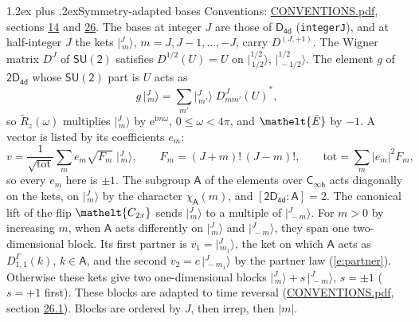 \documentclass[10pt,a4paper]{article}
\makeatletter
\renewcommand\section{\@startsection{section}{1}{\z@}{-3ex plus -1ex minus -.2ex}%
  {1.2ex plus .2ex}{\normalfont\large\sffamily\bfseries\color{parttitle}}}
\numberwithin{equation}{section}
\newcommand{\eltfont}[1]{{\let\sigma\eltsigma\mathelt{#1}}}
\newcommand{\grp}[1]{\mathsf{#1}}
\newcommand{\elt}[1]{\eltfont{#1}}
\newcommand{\grpindex}[2]{[#1 : #2]}
\newcommand{\iunit}{\mathrm{i}}
\newcommand{\expe}{\mathrm{e}}
\newcommand{\irrJp}[2]{D^{(#1,#2)}}
\newcommand{\repD}[1]{D^{#1}}
\newcommand{\wignerD}[1]{D^{#1}}
\newcommand{\chiA}{\chi_{\grp{A}}}
\newcommand{\conj}[1]{{#1}^{*}}
\newcommand{\jm}[2]{\bigl\lvert{}^{#1}_{\,#2}\bigr\rangle}
\newcommand{\barred}[1]{\bar{#1}}
\newcommand{\lift}[1]{\tilde{#1}}
\makeatother
\begin{document}
\section{Symmetry-adapted bases}\label{s:bases}
Conventions: \href{../../CONVENTIONS.pdf}{CONVENTIONS.pdf}, sections \href{../../../rotation/CONVENTIONS.pdf\#conv.14}{14} and \href{../../CONVENTIONS.pdf\#conv.26}{26}.
\leavevmode\label{n:index.m}\label{n:vector.ket}The bases at integer $J$ are those of \href{../../../rotation/data/pdf/D4d.pdf}{$\grp{D_{4d}}$} (\texttt{integerJ}), and at half-integer $J$ the kets $\jm{J}{m}$, $m = J, J-1, \dots, -J$, carry $\irrJp{J}{+1}$. \label{n:matrix.wigner}The Wigner matrix $\wignerD{J}$ of $\grp{SU(2)}$ satisfies $\wignerD{1/2}(U) = U$ on $\jm{1/2}{1/2}$, $\jm{1/2}{-1/2}$. The element $g$ of $\grp{2D_{4d}}$ whose $\grp{SU(2)}$ part is $U$ acts as
\begin{equation}\label{e:action}g\,\jm{J}{m} = \sum_{m'} \jm{J}{m'}\; \conj{\wignerD{J}_{m m'}(U)},\end{equation}
so $\lift{R}_{z}(\omega)$ multiplies $\jm{J}{m}$ by $\expe^{\iunit m\omega}$, $0 \le \omega < 4\pi$, and $\elt{\barred{E}}$ by $-1$. \label{n:index.ketcoefficient}\label{n:vector.basis.symmetry}\label{n:index.ketweight}\label{n:index.total}A vector is listed by its coefficients $e_m$:
\begin{equation}\label{e:ket}v = \frac{1}{\sqrt{\mathrm{tot}}}\sum_m e_m\sqrt{F_m}\;\jm{J}{m},\qquad F_m = (J+m)!\,(J-m)!,\qquad \mathrm{tot} = \sum_m |e_m|^2F_m,\end{equation}
so every $e_m$ here is $\pm 1$.
\leavevmode\label{n:group.A}\label{n:function.character.abelian}The subgroup $\grp{A}$ of the elements over $\grp{C_{\infty h}}$ acts diagonally on the kets, on $\jm{J}{m}$ by the character $\chiA(m)$, and $\grpindex{\grp{2D_{4d}}}{\grp{A}} = 2$. The canonical lift of the flip $\elt{C_{2x}}$ sends $\jm{J}{m}$ to a multiple of $\jm{J}{-m}$. For $m > 0$ by increasing $m$, when $\grp{A}$ acts differently on $\jm{J}{m}$ and $\jm{J}{-m}$, they span one two-dimensional block. \label{n:index.partner.sign}Its first partner is $v_1 = \jm{J}{m_1}$, the ket on which $\grp{A}$ acts as $\repD{\Gamma}_{1,1}(k)$, $k \in \grp{A}$, and the second $v_2 = c\,\jm{J}{-m_1}$ by the partner law (\ref{e:partner}). \label{n:index.pair.sign}Otherwise these kets give two one-dimensional blocks $\jm{J}{m} + s\,\jm{J}{-m}$, $s = \pm 1$ ($s = +1$ first). These blocks are adapted to time reversal (\href{../../CONVENTIONS.pdf}{CONVENTIONS.pdf}, section \href{../../CONVENTIONS.pdf\#conv.26.1}{26.1}). Blocks are ordered by $J$, then irrep, then $|m|$.
\end{document}
